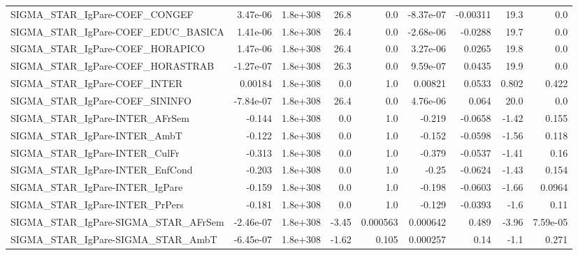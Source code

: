 \begin{tabular}{lrrrrrrrr}
SIGMA\_STAR\_IgPare-COEF\_CONGEF         &    3.47e-06 &     1.8e+308 &    26.8 &      0.0 &  -8.37e-07 &    -0.00311 &         19.3 &           0.0 \\
SIGMA\_STAR\_IgPare-COEF\_EDUC\_BASICA    &    1.41e-06 &     1.8e+308 &    26.4 &      0.0 &  -2.68e-06 &     -0.0288 &         19.7 &           0.0 \\
SIGMA\_STAR\_IgPare-COEF\_HORAPICO       &    1.47e-06 &     1.8e+308 &    26.4 &      0.0 &   3.27e-06 &      0.0265 &         19.8 &           0.0 \\
SIGMA\_STAR\_IgPare-COEF\_HORASTRAB      &   -1.27e-07 &     1.8e+308 &    26.3 &      0.0 &   9.59e-07 &      0.0435 &         19.9 &           0.0 \\
SIGMA\_STAR\_IgPare-COEF\_INTER          &     0.00184 &     1.8e+308 &     0.0 &      1.0 &    0.00821 &      0.0533 &        0.802 &         0.422 \\
SIGMA\_STAR\_IgPare-COEF\_SININFO        &   -7.84e-07 &     1.8e+308 &    26.4 &      0.0 &   4.76e-06 &       0.064 &         20.0 &           0.0 \\
SIGMA\_STAR\_IgPare-INTER\_AFrSem        &      -0.144 &     1.8e+308 &     0.0 &      1.0 &     -0.219 &     -0.0658 &        -1.42 &         0.155 \\
SIGMA\_STAR\_IgPare-INTER\_AmbT          &      -0.122 &     1.8e+308 &     0.0 &      1.0 &     -0.152 &     -0.0598 &        -1.56 &         0.118 \\
SIGMA\_STAR\_IgPare-INTER\_CulFr         &      -0.313 &     1.8e+308 &     0.0 &      1.0 &     -0.379 &     -0.0537 &        -1.41 &          0.16 \\
SIGMA\_STAR\_IgPare-INTER\_EnfCond       &      -0.203 &     1.8e+308 &     0.0 &      1.0 &      -0.25 &     -0.0624 &        -1.43 &         0.154 \\
SIGMA\_STAR\_IgPare-INTER\_IgPare        &      -0.159 &     1.8e+308 &     0.0 &      1.0 &     -0.198 &     -0.0603 &        -1.66 &        0.0964 \\
SIGMA\_STAR\_IgPare-INTER\_PrPers        &      -0.181 &     1.8e+308 &     0.0 &      1.0 &     -0.129 &     -0.0393 &         -1.6 &          0.11 \\
SIGMA\_STAR\_IgPare-SIGMA\_STAR\_AFrSem   &   -2.46e-07 &     1.8e+308 &   -3.45 & 0.000563 &   0.000642 &       0.489 &        -3.96 &      7.59e-05 \\
SIGMA\_STAR\_IgPare-SIGMA\_STAR\_AmbT     &   -6.45e-07 &     1.8e+308 &   -1.62 &    0.105 &   0.000257 &        0.14 &         -1.1 &         0.271 \\

\end{tabular}
